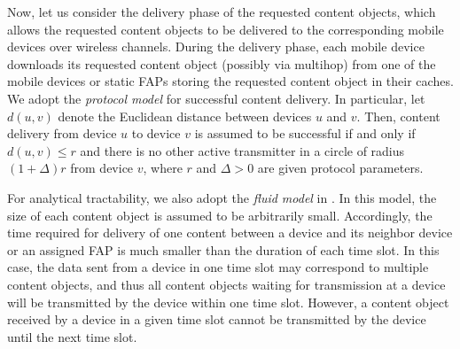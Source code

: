 \documentclass[10pt,journal,compsoc,onecolumn]{IEEEtran}
\begin{document}
Now, let us consider the delivery phase of the requested content
objects, which allows the requested content objects to be
delivered to the corresponding mobile devices over wireless channels.
During the delivery phase, each mobile device downloads its requested
content object (possibly via multihop) from one of the mobile devices or
static FAPs storing the requested content object in their caches. We
adopt the \textit{protocol model} \cite{c8} for successful content
delivery. In particular, let $d(u,v)$ denote the Euclidean
distance between devices $u$ and $v$. Then, content delivery from
device $u$ to device $v$ is assumed to be successful if and only if
$d(u,v) \leq r$ and there is no other active transmitter in a
circle of radius $(1+\Delta)r$ from device $v$, where $r$ and
$\Delta>0$ are given protocol parameters. \par For analytical
tractability, we also adopt the {\em fluid model} in \cite{c1}. In this
model, the size of each content object is assumed to be
arbitrarily small. Accordingly, the time required
for delivery of one content between a device and its neighbor device
or an assigned FAP is much smaller than the duration of each time
slot. In this case, the data sent from a device in
one time slot may correspond to multiple content objects, and
thus all content objects waiting for transmission at a device will
be transmitted by the device within one time slot. However, a
content object received by a device in a given time slot cannot be
transmitted by the device until the next time slot.
\end{document}

